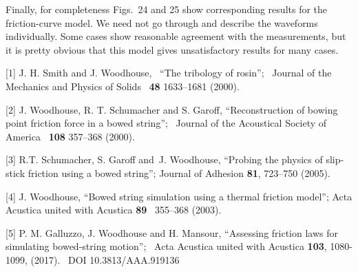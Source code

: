   Finally, for completeness Figs.\ 24 and 25 show corresponding results for the 
  friction-curve model. We need not go through and describe the waveforms 
  individually. Some cases show reasonable agreement with the measurements, but 
  it is pretty obvious that this model gives unsatisfactory results for many 
  cases. 





  \sectionreferences{}[1] J. H. Smith and J. Woodhouse,~ “The tribology of 
  rosin”;~ Journal of the Mechanics and Physics of Solids~ \textbf{48} 
  1633–1681 (2000). 

  [2] J. Woodhouse, R. T. Schumacher and S. Garoff, “Reconstruction of bowing 
  point friction force in a bowed string”;~ Journal of the Acoustical Society 
  of America~ \textbf{108} 357–368 (2000). 

  [3] R.T. Schumacher, S. Garoff and~J. Woodhouse, “Probing the physics of 
  slip-stick friction using a bowed string”; Journal of Adhesion \textbf{81}, 
  723–750 (2005). 

  [4] J. Woodhouse, “Bowed string simulation using a thermal friction model”; 
  Acta Acustica united with Acustica \textbf{89}~ 355–368 (2003). 

  [5] P. M. Galluzzo, J. Woodhouse and H. Mansour, “Assessing friction laws for 
  simulating bowed-string motion”;~ Acta Acustica united with Acustica 
  \textbf{103}, 1080-1099, (2017).~ DOI 10.3813/AAA.919136 